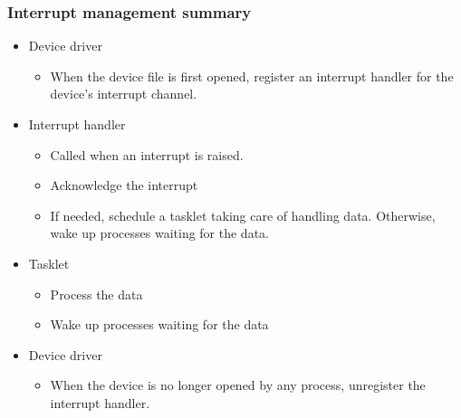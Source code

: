 \begin{frame}
  \frametitle{Interrupt management summary}
  \begin{itemize}
  \item Device driver
    \begin{itemize}
    \item When the device file is first opened, register an interrupt
      handler for the device's interrupt channel.
    \end{itemize}
  \item Interrupt handler
    \begin{itemize}
    \item Called when an interrupt is raised.
    \item Acknowledge the interrupt
    \item If needed, schedule a tasklet taking care of handling
      data. Otherwise, wake up processes waiting for the data.
    \end{itemize}
  \item Tasklet
    \begin{itemize}
    \item Process the data
    \item Wake up processes waiting for the data
    \end{itemize}
  \item Device driver
    \begin{itemize}
    \item When the device is no longer opened by any process,
      unregister the interrupt handler.
    \end{itemize}
  \end{itemize}
\end{frame}
